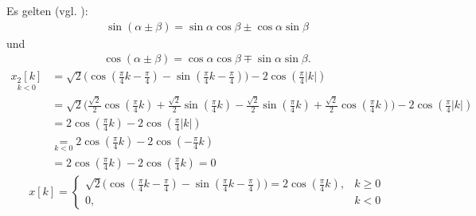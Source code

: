 \documentclass[11pt,a4paper,DIV=12]{scrartcl}
\begin{document}
Es gelten (vgl. \cite[Kap.2, S. 81]{Bronstein2015}):
\begin{align}
	\label{eq:SinAlphaPlusMinusBeta}
	\sin(\alpha\pm\beta)=\sin\alpha\cos\beta\pm\cos\alpha\sin\beta
\end{align}
und
\begin{align}
	\label{eq:CosAlphaPlusMinusBeta}
	\cos(\alpha\pm\beta)=\cos\alpha\cos\beta\mp\sin\alpha\sin\beta.
\end{align}
\begin{align}
	\underset{k<0}{x_2[k]}&=\sqrt{2}\bigg(\cos(\frac{\pi}{4}k-\frac{\pi}{4})-\sin(\frac{\pi}{4}k-\frac{\pi}{4})\bigg)-2\cos(\frac{\pi}{4}|k|)\nonumber\\
	&=\sqrt{2}\bigg(\frac{\sqrt{2}}{2}\cos(\frac{\pi}{4}k)+\frac{\sqrt{2}}{2}\sin(\frac{\pi}{4}k)-\frac{\sqrt{2}}{2}\sin(\frac{\pi}{4}k)+\frac{\sqrt{2}}{2}\cos(\frac{\pi}{4}k)\bigg)-2\cos(\frac{\pi}{4}|k|)\nonumber\\
	&=2\cos(\frac{\pi}{4}k)-2\cos(\frac{\pi}{4}|k|)\nonumber \\
	&\underset{k<0}{=}2\cos(\frac{\pi}{4}k)-2\cos(-\frac{\pi}{4}k)\nonumber\\
	&=2\cos(\frac{\pi}{4}k)-2\cos(\frac{\pi}{4}k)=0
\end{align}
\begin{align}
	x[k]=\begin{cases}
		\sqrt{2}\bigg(\cos(\frac{\pi}{4}k-\frac{\pi}{4})-\sin(\frac{\pi}{4}k-\frac{\pi}{4})\bigg)=2\cos(\frac{\pi}{4}k),&k\geq0 \\
		0, &k<0
	\end{cases}
\end{align}
\end{document}
